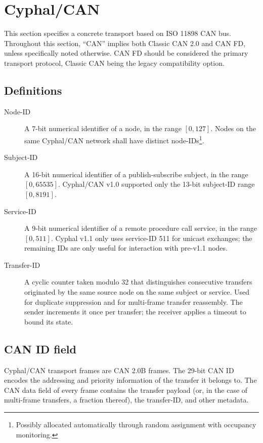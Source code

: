 \section{Cyphal/CAN}\label{sec:transport_can}

This section specifies a concrete transport based on ISO 11898 CAN bus.
Throughout this section, ``CAN'' implies both Classic CAN 2.0 and CAN FD, unless specifically noted otherwise.
CAN FD should be considered the primary transport protocol, Classic CAN being the legacy compatibility option.

\subsection{Definitions}

\begin{description}
    \item[Node-ID] A 7-bit numerical identifier of a node, in the range $[0, 127]$.
    Nodes on the same Cyphal/CAN network shall have distinct node-IDs\footnote{%
        Possibly allocated automatically through random assignment with occupancy monitoring.
    }.

    \item[Subject-ID] A 16-bit numerical identifier of a publish-subscribe subject, in the range $[0, 65535]$.
    Cyphal/CAN v1.0 supported only the 13-bit subject-ID range $[0, 8191]$.

    \item[Service-ID] A 9-bit numerical identifier of a remote procedure call service, in the range $[0, 511]$.
    Cyphal v1.1 only uses service-ID 511 for unicast exchanges; the remaining IDs are only useful for interaction
    with pre-v1.1 nodes.

    \item[Transfer-ID] A cyclic counter taken modulo 32 that distinguishes consecutive transfers originated by
    the same source node on the same subject or service. Used for duplicate suppression and for multi-frame transfer
    reassembly. The sender increments it once per transfer; the receiver applies a timeout to bound its state.
\end{description}

\subsection{CAN ID field}

Cyphal/CAN transport frames are CAN 2.0B frames.
The 29-bit CAN ID encodes the addressing and priority information of the transfer it belongs to.
The CAN data field of every frame contains the transfer payload
(or, in the case of multi-frame transfers, a fraction thereof), the transfer-ID, and other metadata.


